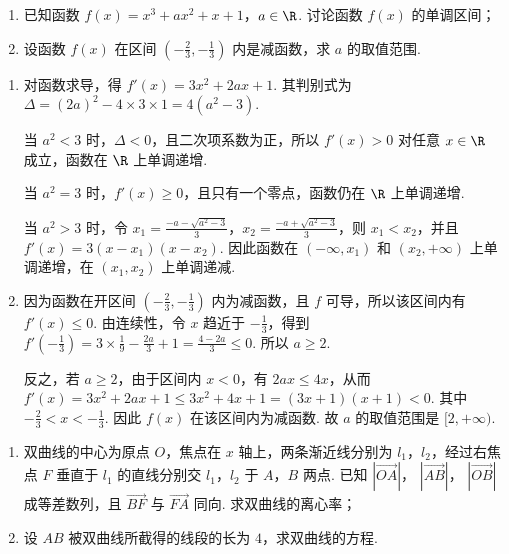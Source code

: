 \begin{problem}
\begin{enumerate}
\item 已知函数 \(f(x) = x^{3} + ax^{2} + x + 1\)，\(a \in \R\). 讨论函数 \( f(x) \) 的单调区间；
\item 设函数 \( f(x) \) 在区间 \( \left(-\frac{2}{3}, -\frac{1}{3}\right) \) 内是减函数，求 \( a \) 的取值范围.
\end{enumerate}
\end{problem}

\begin{solution}
\begin{enumerate}
\item 对函数求导，得
\(
f'(x)=3x^2+2ax+1
\).
其判别式为
\(
\Delta=(2a)^2-4\times3\times1=4(a^2-3)
\).

当 \(a^2<3\) 时，\(\Delta<0\)，且二次项系数为正，所以 \(f'(x)>0\) 对任意 \(x\in\R\) 成立，函数在 \(\R\) 上单调递增.

当 \(a^2=3\) 时，\(f'(x)\geqslant0\)，且只有一个零点，函数仍在 \(\R\) 上单调递增.

当 \(a^2>3\) 时，令 \(x_1=\frac{-a-\sqrt{a^2-3}}{3}\)，\(x_2=\frac{-a+\sqrt{a^2-3}}{3}\)，则 \(x_1<x_2\)，并且
\(
f'(x)=3(x-x_1)(x-x_2)
\).
因此函数在 \(\left(-\infty,x_1\right)\) 和 \(\left(x_2,+\infty\right)\) 上单调递增，在 \(\left(x_1,x_2\right)\) 上单调递减.

\item 因为函数在开区间 \(\left(-\frac{2}{3},-\frac{1}{3}\right)\) 内为减函数，且 \(f\) 可导，所以该区间内有 \(f'(x)\leqslant0\). 由连续性，令 \(x\) 趋近于 \(-\frac{1}{3}\)，得到
\(
f'\left(-\frac{1}{3}\right)=3\times\frac{1}{9}-\frac{2a}{3}+1=\frac{4-2a}{3}\leqslant0
\).
所以 \(a\geqslant2\).

反之，若 \(a\geqslant2\)，由于区间内 \(x<0\)，有 \(2ax\leqslant4x\)，从而
\(
f'(x)=3x^2+2ax+1\leqslant3x^2+4x+1=(3x+1)(x+1)<0
\).
其中 \(-\frac{2}{3}<x< -\frac{1}{3}\). 因此 \(f(x)\) 在该区间内为减函数. 故 \(a\) 的取值范围是 \([2,+\infty)\).
\end{enumerate}
\end{solution}

\begin{problem}
\begin{enumerate}
\item 双曲线的中心为原点 \(O\)，焦点在 \(x\) 轴上，两条渐近线分别为 \(l_{1}\)，\(l_{2}\)，经过右焦点 \(F\) 垂直于 \( l_{1} \) 的直线分别交 \(l_{1}\)，\(l_{2}\) 于 \(A\)，\(B\) 两点. 已知 \( \left|\overrightarrow{OA}\right| \)， \( \left|\overrightarrow{AB}\right| \)， \( \left|\overrightarrow{OB}\right| \) 成等差数列，且 \( \overrightarrow{BF} \) 与 \( \overrightarrow{FA} \) 同向. 求双曲线的离心率；
\item 设 \(AB\) 被双曲线所截得的线段的长为 \(4\)，求双曲线的方程.
\end{enumerate}
\end{problem}

